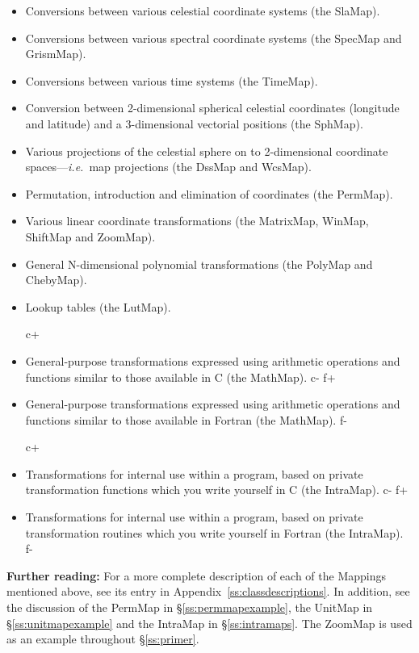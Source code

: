 \documentclass[twoside,11pt]{starlink}
\providecommand{\appref}[1]{Appendix~\ref{#1}}
\providecommand{\secref}[1]{\S\ref{#1}}
\begin{document}
\begin{itemize}
\item Conversions between various celestial coordinate systems (the
SlaMap).

\item Conversions between various spectral coordinate systems (the
SpecMap and GrismMap).

\item Conversions between various time systems (the TimeMap).

\item Conversion between 2-dimensional spherical celestial coordinates
(longitude and latitude) and a 3-dimensional vectorial positions (the SphMap).

\item Various projections of the celestial sphere on to 2-dimensional
coordinate spaces---\emph{i.e.}\ map projections (the DssMap and WcsMap).

\item Permutation, introduction and elimination of coordinates (the
PermMap).

\item Various linear coordinate transformations (the MatrixMap, WinMap,
ShiftMap and ZoomMap).

\item General N-dimensional polynomial transformations (the PolyMap and
ChebyMap).

\item Lookup tables (the LutMap).

c+
\item General-purpose transformations expressed using arithmetic
operations and functions similar to those available in C (the
MathMap).
c-
f+
\item General-purpose transformations expressed using arithmetic
operations and functions similar to those available in Fortran (the
MathMap).
f-

c+
\item Transformations for internal use within a program, based on
private transformation functions which you write yourself in C (the
IntraMap).
c-
f+
\item Transformations for internal use within a program, based on
private transformation routines which you write yourself in Fortran
(the IntraMap).
f-
\end{itemize}

\textbf{Further reading:} For a more complete description of each of the
Mappings mentioned above, see its entry in
\appref{ss:classdescriptions}. In addition, see the discussion of the
PermMap in \secref{ss:permmapexample}, the UnitMap in
\secref{ss:unitmapexample} and the IntraMap in
\secref{ss:intramaps}. The ZoomMap is used as an example throughout
\secref{ss:primer}.
\end{document}

